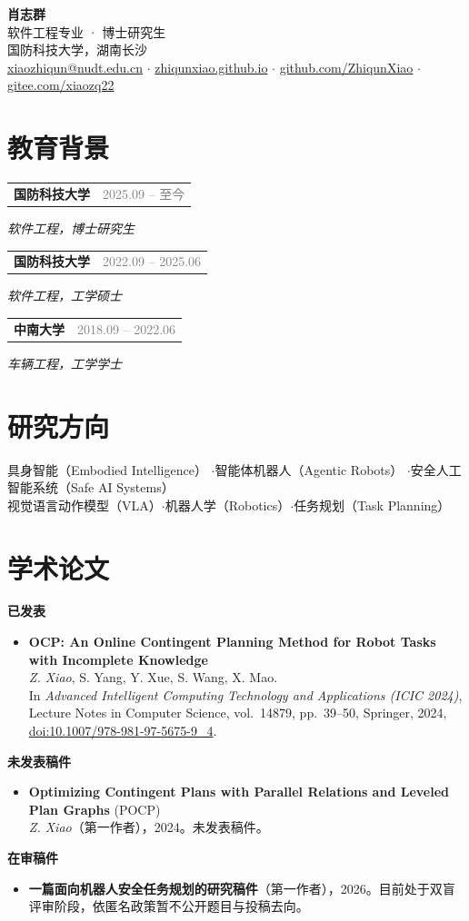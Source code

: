 \documentclass[10pt]{article}
\makeatletter
\newcommand{\entry}[3]{%
  \noindent\begin{tabular*}{\textwidth}{@{}l@{\extracolsep{\fill}}r@{}}
    \textbf{#1} & \textcolor{graytext}{#2}
  \end{tabular*}\par\vspace{-0.25em}
  \noindent\textit{#3}\par\vspace{0.22em}
}
\makeatother
\begin{document}
\linespread{1.02}\selectfont

{\Huge\bfseries 肖志群}\\[0.3em]
{\color{graytext} 软件工程专业 · 博士研究生}\\[0.5em]
国防科技大学，湖南长沙\\
\href{mailto:xiaozhiqun@nudt.edu.cn}{xiaozhiqun@nudt.edu.cn} \quad$\cdot$\quad
\href{https://zhiqunxiao.github.io}{zhiqunxiao.github.io} \quad$\cdot$\quad
\href{https://github.com/ZhiqunXiao}{github.com/ZhiqunXiao} \quad$\cdot$\quad
\href{https://gitee.com/xiaozq22}{gitee.com/xiaozq22}

\section{教育背景}
\entry{国防科技大学}{2025.09 -- 至今}{软件工程，博士研究生}
\entry{国防科技大学}{2022.09 -- 2025.06}{软件工程，工学硕士}
\entry{中南大学}{2018.09 -- 2022.06}{车辆工程，工学学士}

\section{研究方向}
具身智能（Embodied Intelligence） \quad$\cdot$\quad 智能体机器人（Agentic Robots） \quad$\cdot$\quad 安全人工智能系统（Safe AI Systems）\\
视觉语言动作模型（VLA）\quad$\cdot$\quad 机器人学（Robotics）\quad$\cdot$\quad 任务规划（Task Planning）

\section{学术论文}
\noindent\textbf{已发表}
\begin{itemize}
\item \textbf{OCP: An Online Contingent Planning Method for Robot Tasks with Incomplete Knowledge}\\
  \textit{Z. Xiao}, S. Yang, Y. Xue, S. Wang, X. Mao.\\
  In \textit{Advanced Intelligent Computing Technology and Applications (ICIC 2024)}, Lecture Notes in Computer Science, vol.~14879, pp.~39--50, Springer, 2024, \href{https://doi.org/10.1007/978-981-97-5675-9_4}{doi:10.1007/978-981-97-5675-9\_4}.
\end{itemize}
\vspace{0.2em}
\noindent\textbf{未发表稿件}
\begin{itemize}
\item \textbf{Optimizing Contingent Plans with Parallel Relations and Leveled Plan Graphs} (POCP)\\
  \textit{Z. Xiao}（第一作者），2024。未发表稿件。
\end{itemize}
\vspace{0.2em}
\noindent\textbf{在审稿件}
\begin{itemize}
\item \textbf{一篇面向机器人安全任务规划的研究稿件}（第一作者），2026。目前处于双盲评审阶段，依匿名政策暂不公开题目与投稿去向。
\end{itemize}
\end{document}
